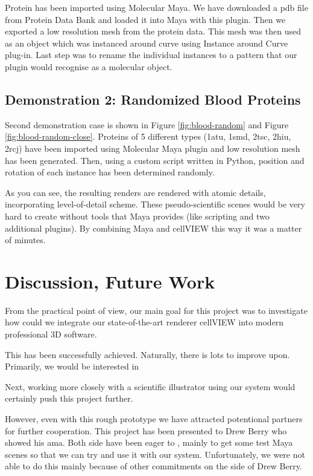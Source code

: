 \documentclass[
  digital, %
  table,   %
  nolof,     %
  nolot,     %
  oneside,
]{fithesis3}
\begin{document}
Protein has been imported using Molecular Maya. We have downloaded a pdb file from Protein Data Bank and loaded it into Maya with this plugin. Then we exported a low resolution mesh from the protein data. This mesh was then used as an object which was instanced around curve using Instance around Curve plug-in. Last step was to rename the individual instances to a pattern that our plugin would recognise as a molecular object.

\section{Demonstration 2: Randomized Blood Proteins}
Second demonstration case is shown in Figure \ref{fig:blood-random} and Figure \ref{fig:blood-random-close}. Proteins of 5 different types (1atu, 1smd, 2tsc, 2hiu, 2rcj) have been imported using Molecular Maya plugin and low resolution mesh has been generated. Then, using a custom script written in Python, position and rotation of each instance has been determined randomly.

As you can see, the resulting renders are rendered with atomic details, incorporating level-of-detail scheme. These pseudo-scientific scenes would be very hard to create without tools that Maya provides (like scripting and two additional plugins). By combining Maya and cellVIEW this way it was a matter of minutes.

\chapter{Discussion, Future Work}
\label{chap:discussion}
From the practical point of view, our main goal for this project was to investigate how could we integrate our state-of-the-art renderer cellVIEW into modern professional 3D software.

This has been successfully achieved. Naturally, there is lots to improve upon. Primarily, we would be interested in

Next, working more closely with a scientific illustrator using our system would certainly push this project further.

However, even with this rough prototype we have attracted potentional partners for further cooperation. This project has been presented to Drew Berry who showed his ama. Both side have been eager to , mainly to get some test Maya scenes so that we can try and use it with our system. Unfortunately, we were not able to do this mainly because of other commitments on the side of Drew Berry.
\end{document}
